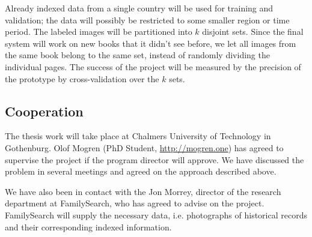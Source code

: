 Already indexed data from a single country will be used for training and validation; the data will possibly be restricted to some smaller region or time period.
The labeled images will be partitioned into $k$ disjoint sets.
Since the final system will work on new books that it didn't see before, we let all images from the same book belong to the same set, instead of randomly dividing the individual pages.
The success of the project will be measured by the precision of the prototype by cross-validation over the $k$ sets.






\subsection{Cooperation}

The thesis work will take place at Chalmers University of Technology in Gothenburg. Olof Mogren (PhD Student, \url{http://mogren.one}) has agreed to supervise the project if the program director will approve. We have discussed the problem in several meetings and agreed on the approach described above.

We have also been in contact with the Jon Morrey, director of the research department at FamilySearch, who has agreed to advise on the project. FamilySearch will supply the necessary data, i.e. photographs of historical records and their corresponding indexed information.




